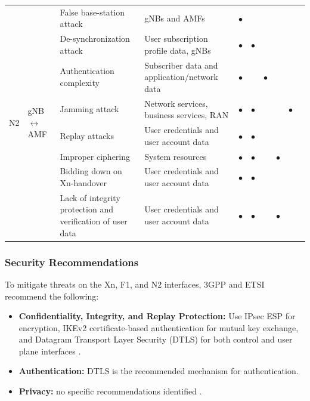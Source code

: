 \documentclass{report}
\begin{document}
\begin{table}[H]
\begin{tabularx}{\textwidth}{|l|l|X|X|c|c|c|c|c|c|}
    \multirow{8}{*}{N2} 
        & \multirow{8}{*}{gNB $\leftrightarrow$ AMF} 
        & False base-station attack & gNBs and AMFs & $\bullet$ &  &  &  &  &  \\ \cline{3-10}
        & & De-synchronization attack & User subscription profile data, gNBs & $\bullet$ & $\bullet$ &  &  &  &  \\ \cline{3-10}
        & & Authentication complexity & Subscriber data and application/network data & $\bullet$ &  & $\bullet$ &  &  &  \\ \cline{3-10}
        & & Jamming attack & Network services, business services, RAN & $\bullet$ & $\bullet$ &  &  & $\bullet$ &  \\ \cline{3-10}
        & & Replay attacks & User credentials and user account data & $\bullet$ & $\bullet$ &  &  &  &  \\ \cline{3-10}
        & & Improper ciphering & System resources & $\bullet$ & $\bullet$ &  & $\bullet$ &  &  \\ \cline{3-10}
        & & Bidding down on Xn-handover & User credentials and user account data & $\bullet$ & $\bullet$ &  &  &  &  \\ \cline{3-10}
        & & Lack of integrity protection and verification of user data & User credentials and user account data & $\bullet$ & $\bullet$ &  & $\bullet$ &  &  \\ \hline
    
    \end{tabularx}
\end{table}


\newpage
\subsubsection{Security Recommendations}
To mitigate threats on the Xn, F1, and N2 interfaces, 3GPP and ETSI recommend the following:
\begin{itemize}
    \item \textbf{Confidentiality, Integrity, and Replay Protection:} Use IPsec ESP for encryption, IKEv2 certificate-based authentication for mutual key exchange, and Datagram Transport Layer Security (DTLS) for both control and user plane interfaces \cite{mahyoub2024security}.
    \item \textbf{Authentication:} DTLS is the recommended mechanism for authentication.
    \item \textbf{Privacy:} no specific recommendations identified \cite{mahyoub2024security}.
\end{itemize}
    
\end{document}
